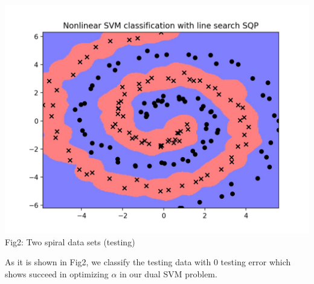 \documentclass{article}
\begin{document}
\begin{spacing}{1.5}
\begin{center}
\includegraphics[width=0.9\linewidth]{testing_data_py.jpg}\\
Fig2: Two spiral data sets (testing)
\end{center}
As it is shown in Fig2, we classify the testing data with 0 testing error which shows succeed in optimizing $\alpha$ in our dual SVM problem.


\end{spacing}
\end{document}
